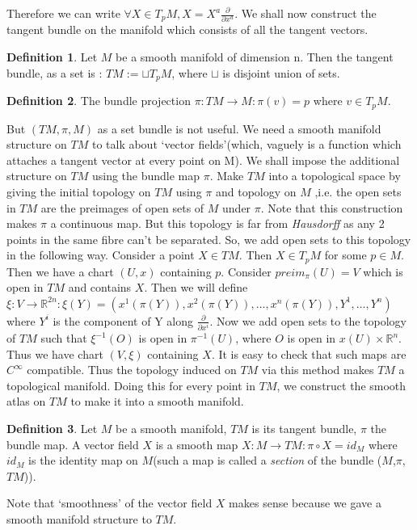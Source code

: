 \documentclass[a4paper]{report}
\theoremstyle{definition}
\newtheorem{definition}{Definition}[section]
\theoremstyle{remark}
\begin{document}
		Therefore we can write $\forall X \in T_pM, X=X^a\tfrac{\partial}{\partial x^a}$.
		We shall now construct the tangent bundle on the manifold which consists of all the tangent vectors.
		\begin{definition}
			Let $M$ be a smooth manifold of dimension n. Then the tangent bundle, as a set is :
			$ TM := \sqcup T_pM $, where $\sqcup$ is disjoint union of sets. 
		\end{definition}
		\begin{definition} 
			The bundle projection $ \pi : TM \to M : \pi(v) = p $ where $ v \in T_pM$. 
		\end{definition}
		But $(TM,\pi,M)$ as a set bundle is not useful. We need a smooth manifold structure on $TM$ to talk about ‘vector fields’(which, vaguely is a function which attaches a tangent vector at every point on M).
		We shall impose the additional structure on $TM$ using the bundle map $\pi$.
		Make $TM$ into a topological space by giving the initial topology on $TM$ using $\pi$ and topology on $M$ ,i.e. the open sets in $TM$ are the preimages of open sets of $M$ under $\pi$. Note that this construction makes $\pi$ a continuous map. But this topology is far from \emph{Hausdorff} as any 2 points in the same fibre can’t be separated. So, we add open sets to this topology in the following way.
		Consider a point $X \in TM$. Then $X \in T_pM $ for some $p \in M$. Then we have a chart $(U,x)$ containing $p$. Consider $preim_{\pi}(U)=V$ which is open in $TM$ and contains $X$. Then we will define $ \xi : V \to \mathbb{R}^{2n}  : \xi(Y) = (x^1(\pi(Y)),x^2(\pi(Y)),\dots,x^n(\pi(Y)),Y^1,\dots,Y^n)$ where $Y^i$ is the component of Y along $\tfrac{\partial}{\partial x^i} $.
		Now we add open sets to the topology of $TM$ such that $\xi^{-1}(O) $ is open in $\pi^{-1}(U) $, where $O$ is open in $x(U)\times \mathbb{R}^n$.
		Thus we have chart $(V,\xi)$ containing $X$. It is easy to check that such maps are $ C^\infty $ compatible. Thus the topology induced on $TM$ via this method makes $TM$ a topological manifold. Doing this for every point in $TM$, we construct the smooth atlas on $TM$ to make it into a smooth manifold.
		\begin{definition} 
			Let $M$ be a smooth manifold, $TM$ is its tangent bundle, $\pi$ the bundle map. A vector field $X$ is a smooth map $ X : M \to TM : \pi\circ X= id_M$ where $ id_M$ is the identity map on $M$(such a map is called a \emph{section} of the bundle ($M$,$\pi$,$TM$)).
		\end{definition}
		Note that ‘smoothness’ of the vector field $X$ makes sense because we gave a smooth manifold structure to $TM$.
\end{document}
